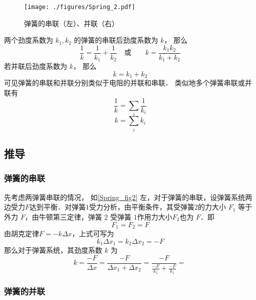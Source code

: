 
\begin{issues}
\issueDraft
\end{issues}

\begin{figure}[ht]
\centering
\texttt{[image: ./figures/Spring\_2.pdf]}
\caption{弹簧的串联（左）、并联（右）} \label{Spring_fig2}
\end{figure}
两个劲度系数为 $k_1, k_2$ 的弹簧的串联后劲度系数为 $k$， 那么
\begin{equation}
\frac{1}{k} = \frac{1}{k_1} + \frac{1}{k_2}
\quad \text{或} \qquad
k = \frac{k_1 k_2}{k_1 + k_2}
\end{equation}
若并联后劲度系数为 $k$， 那么
\begin{equation}
k = k_1 + k_2
\end{equation}
可见弹簧的串联和并联分别类似于电阻的并联和串联． 类似地多个弹簧串联或并联有
\begin{equation}\label{Spring_eq2}
\frac{1}{k} = \sum_i \frac{1}{k_i}
\end{equation}
\begin{equation}\label{Spring_eq3}
k = \sum_i k_i
\end{equation}

\subsection{推导}
\subsubsection{弹簧的串联}
先考虑两弹簧串联的情况，
如\autoref{Spring_fig2} 左，对于弹簧的串联，设弹簧系统两边受力$F$达到平衡．对弹簧$1$受力分析，由平衡条件，其受弹簧$2$的力大小 $F_1$ 等于外力 $F$，由牛顿第三定律，弹簧 $2$ 受弹簧 $1$作用力大小$F_2$也为 $F$．即
\begin{equation}
F_1=F_2=F
\end{equation}
由胡克定律$F=-k\Delta x$，上式可写为
\begin{equation}
k_1\Delta x_1=k_2\Delta x_2=-F
\end{equation}
那么对于弹簧系统，其劲度系数 $k$ 为
\begin{equation}
k=\frac{-F}{\Delta x}=\frac{-F}{\Delta x_1+\Delta x_2}=\frac{-F}{\frac{-F}{k_1}+\frac{-F}{k_1}}=\frac{}{}
\end{equation}

\subsubsection{弹簧的并联}
